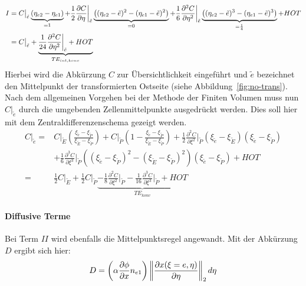 \begin{align*}
  I&= C\big\vert_{\tilde{e}} \underbrace{(\etaii-\etai)}_{=1} + \frac{1}{2} \pder[C]{\eta}\bigg\vert_{\tilde{e}}
  \underbrace{\left({(\etaii-\etilde)^2-(\etai-\etilde)^2}\right)}_{=0}
  +\frac{1}{6} \frac{\partial^2 C}{\partial \eta^2}\bigg\vert_{\tilde{e}}
  \underbrace{\left({(\etaii-\etilde)^3-(\etai-\etilde)^3}\right)}_{=\frac{1}{4}} + HOT\\
  &= C \big\vert_{\tilde{e}}+ \underbrace{\frac{1}{24}  \frac{\partial^2 C}{\partial \eta^2}
\bigg\vert_{\tilde{e}}+HOT}_{TE_{int,konv}}
\end{align*}
Hierbei wird die Abkürzung $C$ zur Übersichtlichkeit eingeführt und $\tilde{e}$ bezeichnet den Mittelpunkt
der transformierten Ostseite (siehe Abbildung~\ref{fig:no-trans}).  Nach dem allgemeinen Vorgehen bei der
Methode der Finiten Volumen muss nun $C\vert_{\tilde{e}}$ durch die umgebenden Zellenmittelpunkte ausgedrückt werden.
Dies soll hier mit dem Zentraldifferenzenschema gezeigt werden.
\begin{align*}
   C\big\vert_{\tilde{e}}
   =& C\big\vert_{\tilde{E}}
   \left({\frac{\xi_{\tilde{e}}-\xi_{\tilde{P}}}{\xi_{\tilde{E}}-\xi_{\tilde{P}}}}\right)
   + C\big\vert_{\tilde{P}} \left({1-\frac{\xi_{\tilde{e}}-\xi_{\tilde{P}}}{\xi_{\tilde{E}}-\xi_{\tilde{P}}} }\right)
   + \frac{1}{2} \frac{\partial^2 C}{\partial \xi^2}\bigg\vert_{\tilde{P}}
   (\xi_{\tilde{e}}-\xi_{\tilde{E}})(\xi_{\tilde{e}}-\xi_{\tilde{P}})\\
   &+ \frac{1}{6}  \frac{\partial^3 C}{\partial \xi^3}\bigg\vert_{\tilde{P}}
   \left({(\xi_{\tilde{e}}-\xi_{\tilde{P}})^2-(\xi_{\tilde{E}}-\xi_{\tilde{P}})^2}\right)
   (\xi_{\tilde{e}}-\xi_{\tilde{P}}) + HOT\\
   =&\frac{1}{2} C \big\vert_{\tilde{E}} + \frac{1}{2} C \big\vert_{\tilde{P}}
   \underbrace{- \frac{1}{8} \frac{\partial^2 C}{\partial \xi^2}\bigg\vert_{\tilde{P}}
   - \frac{1}{16} \frac{\partial^3 C}{\partial \xi^3}\bigg\vert_{\tilde{P}} + HOT}_{TE_{konv}}
\end{align*}



\paragraph{Diffusive Terme}
Bei Term $II$ wird ebenfalls die Mittelpunktsregel angewandt. Mit der Abkürzung $D$
ergibt sich hier:
\begin{equation*}
  D=  \left({\alpha \pder[\phi]{x} n_{e1}}\right)
  \left\lVert \frac{\partial x(\xi=e, \eta)}{\partial \eta} \right\rVert_2 d\eta
\end{equation*}

